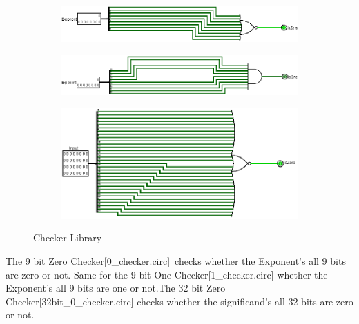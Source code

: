 \documentclass[a4paper,12pt]{article}
\begin{document}
\begin{figure}[H]
    \centering
    \begin{subfigure}[b]{0.45\textwidth}
        \centering
        \includegraphics[width=\textwidth]{0_checker.png}
    \end{subfigure}
    \hfill
    \begin{subfigure}[b]{0.45\textwidth}
        \centering
        \includegraphics[width=\textwidth]{1_checker.png}
    \end{subfigure}
    \hfill
    \begin{subfigure}[b]{0.45\textwidth}
        \centering
        \includegraphics[width=\textwidth]{32bit_0_checker.png}
    \end{subfigure}
    \caption{Checker Library}
\end{figure}
The 9 bit Zero Checker[0\_checker.circ]\ checks whether the Exponent's all 9
bits are zero or not. Same for the 9 bit One Checker[1\_checker.circ] whether
the Exponent's all 9 bits are one or not.The 32 bit Zero
Checker[32bit\_0\_checker.circ] checks whether the significand's all 32 bits
are zero or not.
\end{document}
